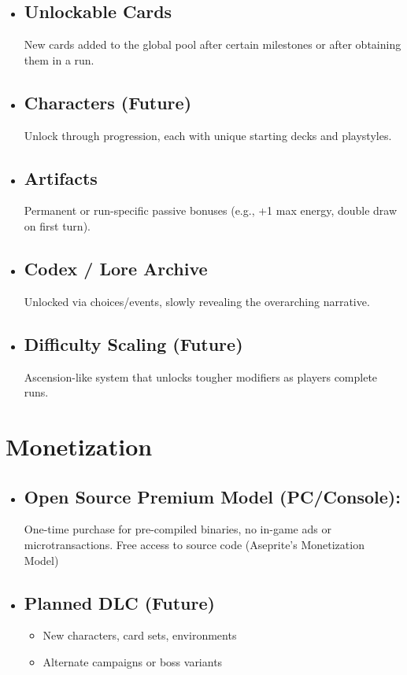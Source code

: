 \documentclass[10pt, a4paper]{article}
\begin{document}
	\begin{itemize}
		\item \subsection{Unlockable Cards} New cards added to the global pool after certain milestones or after obtaining them in a run.
		
		\item \subsection{Characters (Future) } Unlock through progression, each with unique starting decks and playstyles.
		
		\item \subsection{Artifacts} Permanent or run-specific passive bonuses (e.g., +1 max energy, double draw on first turn).
		
		\item \subsection{Codex / Lore Archive} Unlocked via choices/events, slowly revealing the overarching narrative.
		
		\item \subsection{Difficulty Scaling (Future)} Ascension-like system that unlocks tougher modifiers as players complete runs.
	\end{itemize}
	\section{Monetization}
	
	\begin{itemize}
		\item \subsection{Open Source Premium Model (PC/Console):} One-time purchase for pre-compiled binaries, no in-game ads or microtransactions. Free access to source code (Aseprite's Monetization Model)
		
		\item \subsection{Planned DLC (Future)}
		\begin{itemize}
			\item New characters, card sets, environments
			\item Alternate campaigns or boss variants
		\end{itemize}
	\end{itemize}
	
\end{document}
